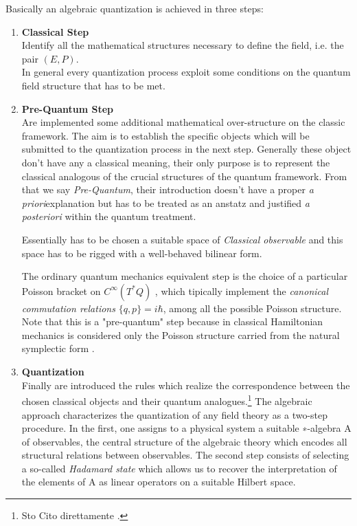 \documentclass[Main]{subfiles}
\begin{document}
Basically an algebraic quantization is achieved in three steps:
\begin{enumerate}
	\item \textbf{Classical Step}\\
		Identify all the mathematical structures necessary to define the field, i.e. the pair $(E,P)$.\\
		In general every quantization process exploit some conditions on the quantum field structure that has to be met.
	\item \textbf{Pre-Quantum Step}\\
		\danger Are implemented %
		some additional mathematical over-structure  on the classic framework. The aim is to establish the specific objects which will be submitted to the quantization process in the next step. 
		Generally these object don't have any a classical meaning, their only purpose is to represent the classical analogous of the crucial structures of the quantum framework. 
		From that we say \emph{Pre-Quantum}, their introduction doesn't have a proper \emph{a priori}explanation but has to be treated as an anstatz and justified \emph{a posteriori} within the quantum treatment.
		
		Essentially has to be chosen a suitable space of \emph{Classical observable} and this space has to be rigged with a well-behaved bilinear form.
		
		The ordinary quantum mechanics equivalent step is the choice of a particular Poisson bracket on $C^\infty(T^*Q)$ , which tipically implement the \emph{canonical commutation relations} $\{q,p\}=i\hbar$, among all the possible Poisson structure.
		Note that this is a "pre-quantum" step because in classical Hamiltonian mechanics is considered only the Poisson structure carried from the natural symplectic form \cite{Abraham1978}.
		
		
	\item \textbf{Quantization}\\
		Finally are introduced the rules which realize the correspondence between the chosen classical objects and their quantum analogues.\danger\footnote{ Sto Cito direttamente \cite{Benini2013}.} 
		The algebraic approach characterizes the quantization of any field theory as a two-step procedure. In the first,
one assigns to a physical system a suitable ∗-algebra A of observables, the central structure of the algebraic theory which encodes all structural relations between observables. The second step consists of selecting a so-called \emph{Hadamard state} which allows us to recover the interpretation of the elements of A as linear operators on a suitable Hilbert space.
\end{enumerate}
\end{document}
